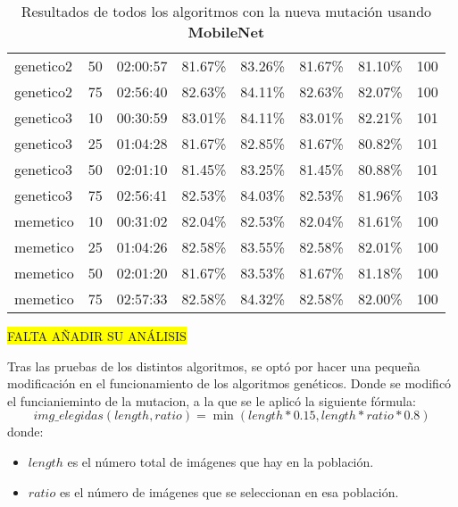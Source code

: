 \begin{table}[htp]
{\begin{tabular}{lp{2cm}lp{2cm}p{2cm}p{2cm}p{2cm}p{2.2cm}}
        \rowcolor{gray!40}genetico2 & 50 & 02:00:57 & 81.67\% & 83.26\% & 81.67\% & 81.10\% & 100 \\
        \rowcolor{gray!40}genetico2 & 75 & 02:56:40 & 82.63\% & 84.11\% & 82.63\% & 82.07\% & 100 \\
        \rowcolor{gray!10}genetico3 & 10 & 00:30:59 & 83.01\% & 84.11\% & 83.01\% & 82.21\% & 101 \\
        \rowcolor{gray!10}genetico3 & 25 & 01:04:28 & 81.67\% & 82.85\% & 81.67\% & 80.82\% & 101 \\
        \rowcolor{gray!10}genetico3 & 50 & 02:01:10 & 81.45\% & 83.25\% & 81.45\% & 80.88\% & 101 \\
        \rowcolor{gray!10}genetico3 & 75 & 02:56:41 & 82.53\% & 84.03\% & 82.53\% & 81.96\% & 103 \\
        \rowcolor{gray!40}memetico & 10 & 00:31:02 & 82.04\% & 82.53\% & 82.04\% & 81.61\% & 100 \\
        \rowcolor{gray!40}memetico & 25 & 01:04:26 & 82.58\% & 83.55\% & 82.58\% & 82.01\% & 100 \\
        \rowcolor{gray!40}memetico & 50 & 02:01:20 & 81.67\% & 83.53\% & 81.67\% & 81.18\% & 100 \\
        \rowcolor{gray!40}memetico & 75 & 02:57:33 & 82.58\% & 84.32\% & 82.58\% & 82.00\% & 100 \\
        \bottomrule
        \end{tabular}
    }
    \caption{Resultados de todos los algoritmos con la nueva mutación usando \textbf{MobileNet}}
    \label{tab:generation-rps-with-old-mutation}
\end{table}

\colorbox{yellow}{FALTA AÑADIR SU ANÁLISIS}

Tras las pruebas de los distintos algoritmos, se optó por hacer una pequeña modificación en el funcionamiento de los
algoritmos genéticos.
Donde se modificó el funcianieminto de la mutacion, a la que se le aplicó la siguiente fórmula:
\[
img\_elegidas(length, ratio)=\min(length*0.15, length*ratio*0.8)
\]
donde:
\begin{itemize}
    \item $length$ es el número total de imágenes que hay en la población.
    \item $ratio$ es el número de imágenes que se seleccionan en esa población.
\end{itemize}

